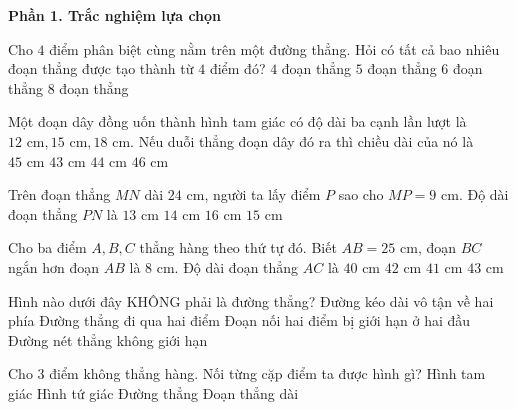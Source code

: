 \textbf{Phần 1. Trắc nghiệm lựa chọn}

\begin{ex} %
Cho $4$ điểm phân biệt cùng nằm trên một đường thẳng. Hỏi có tất cả bao nhiêu đoạn thẳng được tạo thành từ $4$ điểm đó?
\choice
{$4$ đoạn thẳng}
{$5$ đoạn thẳng}
{\True $6$ đoạn thẳng}
{$8$ đoạn thẳng}
\end{ex}

\begin{ex} %
Một đoạn dây đồng uốn thành hình tam giác có độ dài ba cạnh lần lượt là $12\text{ cm}, 15\text{ cm}, 18\text{ cm}$. Nếu duỗi thẳng đoạn dây đó ra thì chiều dài của nó là
\choice
{\True $45\text{ cm}$}
{$43\text{ cm}$}
{$44\text{ cm}$}
{$46\text{ cm}$}
\end{ex}

\begin{ex} %
Trên đoạn thẳng $MN$ dài $24\text{ cm}$, người ta lấy điểm $P$ sao cho $MP = 9\text{ cm}$. Độ dài đoạn thẳng $PN$ là
\choice
{$13\text{ cm}$}
{$14\text{ cm}$}
{$16\text{ cm}$}
{\True $15\text{ cm}$}
\end{ex}

\begin{ex} %
Cho ba điểm $A, B, C$ thẳng hàng theo thứ tự đó. Biết $AB = 25\text{ cm}$, đoạn $BC$ ngắn hơn đoạn $AB$ là $8\text{ cm}$. Độ dài đoạn thẳng $AC$ là
\choice
{$40\text{ cm}$}
{\True $42\text{ cm}$}
{$41\text{ cm}$}
{$43\text{ cm}$}
\end{ex}

\begin{ex} %
Hình nào dưới đây KHÔNG phải là đường thẳng?
\choice
{Đường kéo dài vô tận về hai phía}
{Đường thẳng đi qua hai điểm}
{\True Đoạn nối hai điểm bị giới hạn ở hai đầu}
{Đường nét thẳng không giới hạn}
\end{ex}

\begin{ex} %
Cho $3$ điểm không thẳng hàng. Nối từng cặp điểm ta được hình gì?
\choice
{\True Hình tam giác}
{Hình tứ giác}
{Đường thẳng}
{Đoạn thẳng dài}
\end{ex}

